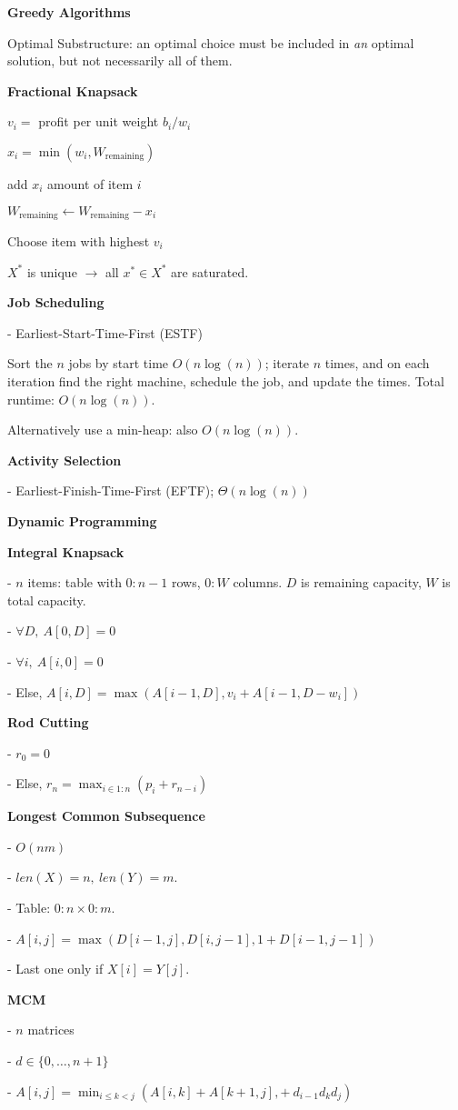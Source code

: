 \documentclass[8pt, letterpaper]{extarticle}
\begin{document}
\noindent
\begin{minipage}[t]{0.45\textwidth}

    
\textbf{Greedy Algorithms}

Optimal Substructure: an optimal choice must be included in \emph{an} optimal solution, but not necessarily all of them.


\textbf{Fractional Knapsack}

$v_i = $ profit per unit weight $b_i / w_i$

$x_i = \min(w_i, W_\text{remaining})$

add $x_i$ amount of item $i$

$W_\text{remaining} \leftarrow W_\text{remaining} - x_i$

Choose item with highest $v_i$

$X^*$ is unique $\rightarrow$ all $x^* \in X^*$ are saturated.


\textbf{Job Scheduling}

- Earliest-Start-Time-First (ESTF)

Sort the $n$ jobs by start time $O(n\log(n))$; iterate $n$ times, and on each iteration find the right machine, schedule the job, and update the times. Total runtime: $O(n\log(n))$.

Alternatively use a min-heap: also $O(n\log(n))$.


\textbf{Activity Selection}

- Earliest-Finish-Time-First (EFTF); $\Theta(n\log(n))$

\textbf{Dynamic Programming}

\textbf{Integral Knapsack}

- $n$ items: table with $0:n-1$ rows, $0:W$ columns. $D$ is remaining capacity, $W$ is total capacity.

- $\forall D, \ A[0,D] = 0$

- $\forall i, \ A[i,0] = 0$

- Else, $A[i,D] = \max(A[i-1, D], v_i + A[i-1, D - w_i])$

\textbf{Rod Cutting}

- $r_0 = 0$

- Else, $r_n = \max_{i \in 1:n} (p_{i} + r_{n-i})$

\textbf{Longest Common Subsequence}

- $O(nm)$

- $len(X) = n, \ len(Y) = m$.

- Table: $0:n \times 0:m$.

- $A[i,j] = \max(D[i-1, j], D[i, j-1], 1 + D[i-1, j-1])$

- Last one only if $X[i] = Y[j]$.

\textbf{MCM}

- $n$ matrices

- $d \in \{0, \ldots, n+1\}$

- $A[i, j] = \min_{i \leq k < j} (A[i,k] + A[k+1, j], +\ d_{i-1}d_k d_j )$

\end{minipage}
\end{document}
